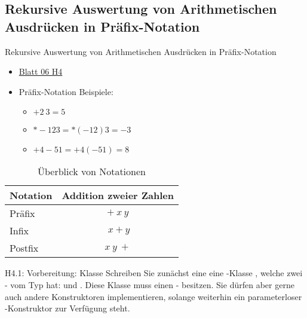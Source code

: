 \documentclass{../tuda-beamer}
\begin{document}
    \subsection{Rekursive Auswertung von Arithmetischen Ausdrücken in Präfix-Notation}
    \begin{frame}{Rekursive Auswertung von Arithmetischen Ausdrücken in Präfix-Notation}
        \begin{itemize}
            \item \href{https://moodle.informatik.tu-darmstadt.de/pluginfile.php/202303/mod_resource/content/3/uebung06.pdf}{Blatt 06 H4}
            \item Präfix-Notation Beispiele:
            \begin{itemize}
                \item \(+ 2 \ 3 = 5\)
                \item \(* - 1 2 3 = * (-1 2) 3 = - 3\)
                \item \(+ 4 - 5 1 = + 4 (- 5 1) = 8\)
            \end{itemize}
        \end{itemize}

        \begin{table}[h]
            \centering
            \begin{tabular}{lc}
                \toprule
                \textbf{Notation} & \textbf{Addition zweier Zahlen}
                \\
                \midrule
                Präfix & \(+ \ x \ y\)
                \\
                Infix & \(\ x + y\)
                \\
                Postfix & \(x \ y \ +\)
                \\
                \bottomrule
            \end{tabular}
            \caption{Überblick von Notationen}
        \end{table}
    \end{frame}

    \begin{frame}[c]{H4.1: Vorbereitung: Klasse }
        Schreiben Sie zunächst eine eine -Klasse
        , welche zwei
        - vom Typ  hat:
         und . Diese Klasse muss
        einen  - besitzen.
        Sie dürfen aber gerne auch andere Konstruktoren implementieren, solange weiterhin ein
        parameterloser -Konstruktor zur Verfügung steht.
    \end{frame}
\end{document}
